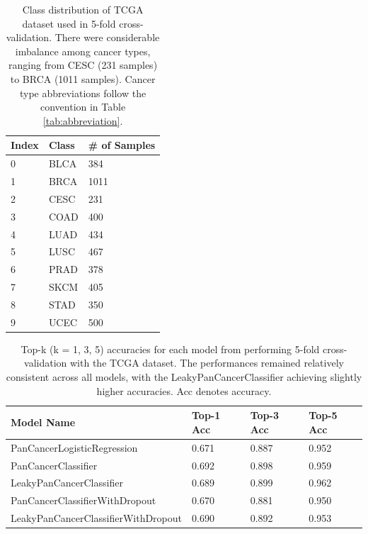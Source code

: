 \documentclass{l4proj}
\begin{document}
\begin{table}[]
\centering
\caption{Class distribution of TCGA dataset used in 5-fold cross-validation. There were considerable imbalance among cancer types, ranging from CESC (231 samples) to BRCA (1011 samples). Cancer type abbreviations follow the convention in Table \ref{tab:abbreviation}.}

\label{tab:datafold}
\begin{tabular}{@{}lll@{}}
\textbf{Index} & \textbf{Class} & \textbf{\# of Samples} \\ \midrule
0     & BLCA  & 384           \\
1     & BRCA  & 1011          \\
2     & CESC  & 231           \\
3     & COAD  & 400           \\
4     & LUAD  & 434           \\
5     & LUSC  & 467           \\
6     & PRAD  & 378           \\
7     & SKCM  & 405           \\
8     & STAD  & 350           \\
9     & UCEC  & 500           \\ 
\end{tabular}
\end{table}

\begin{table}[]
\centering
\caption{Top-k (k = 1, 3, 5) accuracies for each model from performing 5-fold cross-validation with the TCGA dataset. The performances remained relatively consistent across all models, with the LeakyPanCancerClassifier achieving slightly higher accuracies. Acc denotes accuracy.}
\label{tab:5foldacc}
\begin{tabular}{@{}llll@{}}
\textbf{Model Name}                 & \textbf{Top-1 Acc} & \textbf{Top-3 Acc} & \textbf{Top-5 Acc} \\ \midrule
PanCancerLogisticRegression         & 0.671       & 0.887       & 0.952       \\
PanCancerClassifier                 & 0.692       & 0.898       & 0.959       \\
LeakyPanCancerClassifier            & 0.689       & 0.899       & 0.962       \\
PanCancerClassifierWithDropout      & 0.670       & 0.881       & 0.950       \\
LeakyPanCancerClassifierWithDropout & 0.690       & 0.892       & 0.953      
\end{tabular}
\end{table}
\end{document}
